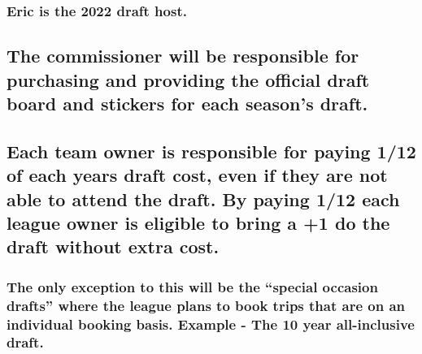 \documentclass[
]{book}
\begin{document}
\hypertarget{eric-is-the-2022-draft-host.}{%
\subsubsection{Eric is the 2022 draft host.}\label{eric-is-the-2022-draft-host.}}

\hypertarget{the-commissioner-will-be-responsible-for-purchasing-and-providing-the-official-draft-board-and-stickers-for-each-seasons-draft.}{%
\subsection{The commissioner will be responsible for purchasing and providing the official draft board and stickers for each season's draft.}\label{the-commissioner-will-be-responsible-for-purchasing-and-providing-the-official-draft-board-and-stickers-for-each-seasons-draft.}}

\hypertarget{each-team-owner-is-responsible-for-paying-112-of-each-years-draft-cost-even-if-they-are-not-able-to-attend-the-draft.-by-paying-112-each-league-owner-is-eligible-to-bring-a-1-do-the-draft-without-extra-cost.}{%
\subsection{Each team owner is responsible for paying 1/12 of each years draft cost, even if they are not able to attend the draft. By paying 1/12 each league owner is eligible to bring a +1 do the draft without extra cost.}\label{each-team-owner-is-responsible-for-paying-112-of-each-years-draft-cost-even-if-they-are-not-able-to-attend-the-draft.-by-paying-112-each-league-owner-is-eligible-to-bring-a-1-do-the-draft-without-extra-cost.}}

\hypertarget{the-only-exception-to-this-will-be-the-special-occasion-drafts-where-the-league-plans-to-book-trips-that-are-on-an-individual-booking-basis.-example---the-10-year-all-inclusive-draft.}{%
\subsubsection{The only exception to this will be the ``special occasion drafts'' where the league plans to book trips that are on an individual booking basis. Example - The 10 year all-inclusive draft.}\label{the-only-exception-to-this-will-be-the-special-occasion-drafts-where-the-league-plans-to-book-trips-that-are-on-an-individual-booking-basis.-example---the-10-year-all-inclusive-draft.}}
\end{document}
